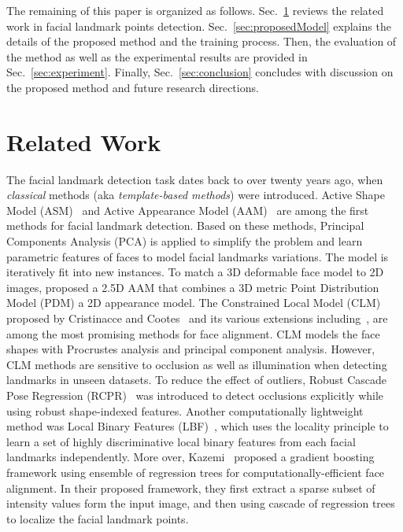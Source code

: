 \documentclass[times,twocolumn,final,authoryear]{elsarticle}
\begin{document}
The remaining of this paper is organized as follows. Sec.~\ref{sec:lit} reviews the related work in facial landmark points detection. Sec.~\ref{sec:proposedModel} explains the details of the proposed method and the training process. Then, the evaluation of the method as well as the experimental results are provided in Sec.~\ref{sec:experiment}. Finally, Sec.~\ref{sec:conclusion} concludes with discussion on the proposed method and future research directions.  

\section{Related Work}
\label{sec:lit}
The facial landmark detection task dates back to over twenty years ago, when \textit{classical} methods (aka \textit{template-based methods}) were introduced. Active Shape Model (ASM)~\cite{cootes2000introduction} and Active Appearance Model (AAM)~\cite{cootes1998active, martins2013generative} are among the first methods for facial landmark detection. Based on these methods, Principal Components Analysis (PCA) is applied to simplify the problem and learn parametric features of faces to model facial landmarks variations. The model is iteratively fit into new instances. To match a 3D deformable face model to 2D images, \cite{martins2013generative} proposed a 2.5D AAM that combines a 3D metric Point Distribution Model (PDM) a 2D appearance model. The Constrained Local Model (CLM) proposed by Cristinacce and Cootes~\cite{cristinacce2006feature} and its various extensions including~\cite{asthana2013robust, baltruvsaitis20123d, saragih2011deformable, wang2008enforcing}, are among the most promising methods for face alignment. CLM models the face shapes with Procrustes analysis and principal component analysis. However, CLM methods are sensitive to occlusion as well as illumination when detecting landmarks in unseen datasets. To reduce the effect of outliers, Robust Cascade Pose Regression (RCPR)~\cite{burgos2013robust} was introduced to detect occlusions explicitly while using robust shape-indexed features. Another computationally lightweight method was Local Binary Features (LBF)~\cite{ren2014face}, which uses the locality principle to learn a set of highly discriminative local binary features from each facial landmarks independently. More over, Kazemi~\cite{kazemi2014one} proposed a gradient boosting framework using ensemble of regression trees for computationally-efficient face alignment. In their proposed framework, they first extract a sparse subset of intensity values form the input image, and then using cascade of regression trees to localize the facial landmark points. 
\end{document}
